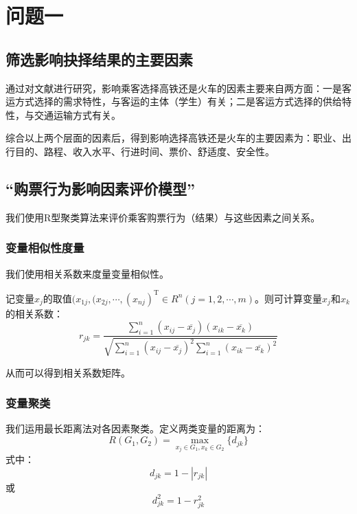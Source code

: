 \documentclass{ctexart}
\newcounter{sub}
\begin{document}
\section{问题一}%
\label{sec:问题一}
\subsection{筛选影响抉择结果的主要因素}
通过对文献进行研究，影响乘客选择高铁还是火车的因素主要来自两方面：一是客运方式选择的需求特性，与客运的主体（学生）有关；二是客运方式选择的供给特性，与交通运输方式有关。

综合以上两个层面的因素后，得到影响选择高铁还是火车的主要因素为：职业、出行目的、路程、收入水平、行进时间、票价、舒适度、安全性。

\subsection{\enquote{购票行为影响因素评价模型}}
我们使用R型聚类算法来评价乘客购票行为（结果）与这些因素之间关系。
\subsubsection{变量相似性度量}
我们使用相关系数来度量变量相似性。

记变量$x_j$的取值$(x_{1j},(x_{2j}, \cdots, (x_{nj})^\mathrm{T} \in  R^n(j=1,2,\cdots ,m)$。则可计算变量$x_j$和$x_k$的相关系数：
\begin{equation}
	r_{jk}=\frac{\sum\limits^n_{i=1} (x_{ij}- \overline{  x_{j}  })(x_{ik}-\overline{  x_{k}  })  }           { \sqrt{ \sum\limits^n_{i=1} {(x_{ij}-\overline{  x_{j}  })}^2     \sum\limits^n_{i=1} {(x_{ik}-\overline{  x_{k}  })}^2}}
\end{equation}

从而可以得到相关系数矩阵。

\subsubsection{变量聚类}
我们运用最长距离法对各因素聚类。定义两类变量的距离为：
\begin{equation}
	R(G_1,G_2)=\max\limits_{x_j \in G_1,x_k \in G_2}   \{d_{jk}\}
\end{equation}
式中：
\begin{equation}
	d_{jk}=1-|r_{jk}|
\end{equation}
或
\begin{equation}
	d^2_{jk}=1-r^2_{jk}
\end{equation}
\end{document}
